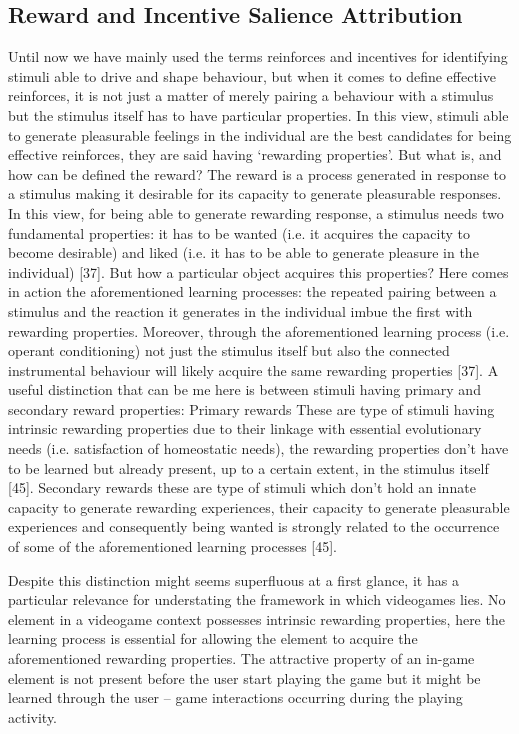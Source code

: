 \subsection{Reward and Incentive Salience Attribution}
\label{incentive_salience}
Until now we have mainly used the terms reinforces and incentives for identifying stimuli able to drive and shape behaviour, but when it comes to define effective reinforces, it is not just a matter of merely pairing a behaviour with a stimulus but the stimulus itself has to have particular properties. In this view, stimuli able to generate pleasurable feelings in the individual are the best candidates for being effective reinforces, they are said having ‘rewarding properties’. But what is, and how can be defined the reward?  The reward is a process generated in response to a stimulus making it desirable for its capacity to generate pleasurable responses. In this view, for being able to generate rewarding response, a stimulus needs two fundamental properties: it has to be wanted (i.e. it acquires the capacity to become desirable) and liked (i.e. it has to be able to generate pleasure in the individual) [37]. But how a particular object acquires this properties? Here comes in action the aforementioned learning processes: the repeated pairing between a stimulus and the reaction it generates in the individual imbue the first with rewarding properties. Moreover, through the aforementioned learning process (i.e. operant conditioning) not just the stimulus itself but also the connected instrumental behaviour will likely acquire the same rewarding properties [37]. A useful distinction that can be me here is between stimuli having primary and secondary reward properties:
Primary rewards 
These are type of stimuli having intrinsic rewarding properties due to their linkage with essential evolutionary needs (i.e. satisfaction of homeostatic needs),  the rewarding properties don’t have to be learned but already present, up to a certain extent, in the stimulus itself [45]. 
Secondary rewards
these are type of stimuli which don’t hold an innate capacity to generate rewarding experiences, their capacity to generate pleasurable experiences and consequently being wanted is strongly related to the occurrence of some of the aforementioned learning processes [45].

Despite this distinction might seems superfluous at a first glance, it has a particular relevance for understating the framework in which videogames lies. No element in a videogame context possesses intrinsic rewarding properties, here the learning process is essential for allowing the element to acquire the aforementioned rewarding properties. The attractive property of an in-game element is not present before the user start playing the game but it might be learned through the user – game interactions occurring during the playing activity.

